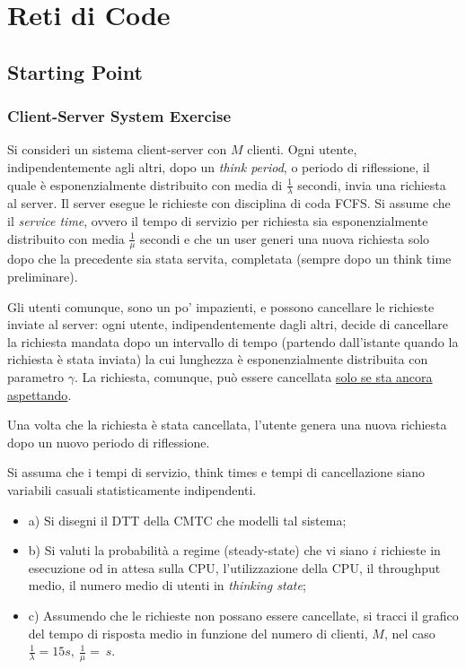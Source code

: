 
\chapter{Reti di Code}
\label{cap:qnet}

\section{Starting Point}

\subsection{Client-Server System Exercise}

Si consideri un sistema client-server con $M$ clienti. Ogni utente, indipendentemente agli altri, dopo un \textit{think period}, o periodo di riflessione, il quale è esponenzialmente distribuito con media di $\frac{1}{\lambda}$ secondi, invia una richiesta al server.
Il server esegue le richieste con disciplina di coda FCFS. Si assume che il \textit{service time}, ovvero il tempo di servizio per richiesta sia esponenzialmente distribuito con media $\frac{1}{\mu}$ secondi e che un user generi una nuova richiesta solo dopo che la precedente sia stata servita, completata (sempre dopo un think time preliminare).

Gli utenti comunque, sono un po' impazienti, e possono cancellare le richieste inviate al server: ogni utente, indipendentemente dagli altri, decide di cancellare la richiesta mandata dopo un intervallo di tempo (partendo dall'istante quando la richiesta è stata inviata) la cui lunghezza è esponenzialmente distribuita con parametro $\gamma$. La richiesta, comunque, può essere cancellata \underline{solo se sta ancora aspettando}.

Una volta che la richiesta è stata cancellata, l'utente genera una nuova richiesta dopo un nuovo periodo di riflessione. 

Si assuma che i tempi di servizio, think times e tempi di cancellazione siano variabili casuali statisticamente indipendenti.

\begin{itemize}

\item a) Si disegni il DTT della CMTC che modelli tal sistema;
\item b) Si valuti la probabilità a regime (steady-state) che vi siano $i$ richieste in esecuzione od in attesa sulla CPU, l'utilizzazione della CPU, il throughput medio, il numero medio di utenti in \textit{thinking state};
\item c) Assumendo che le richieste non possano essere cancellate, si tracci il grafico del tempo di risposta medio in funzione del numero di clienti, $M$, nel caso $\frac{1}{\lambda}=15 s,\ \frac{1}{\mu}=\ s$.

\end{itemize}

